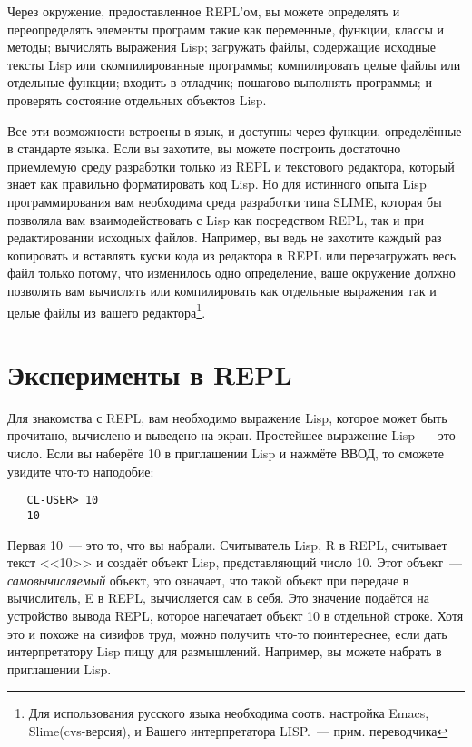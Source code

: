Через окружение, предоставленное REPL'ом, вы можете определять и переопределять элементы
программ такие как переменные, функции, классы и методы; вычислять выражения Lisp;
загружать файлы, содержащие исходные тексты Lisp или скомпилированные программы;
компилировать целые файлы или отдельные функции; входить в отладчик; пошагово выполнять
программы; и проверять состояние отдельных объектов Lisp.

Все эти возможности встроены в язык, и доступны через функции, определённые в стандарте
языка. Если вы захотите, вы можете построить достаточно приемлемую среду разработки только
из REPL и текстового редактора, который знает как правильно форматировать код Lisp. Но для
истинного опыта Lisp программирования вам необходима среда разработки типа SLIME, которая
бы позволяла вам взаимодействовать с Lisp как посредством REPL, так и при редактировании
исходных файлов. Например, вы ведь не захотите каждый раз копировать и вставлять куски
кода из редактора в REPL или перезагружать весь файл только потому, что изменилось одно
определение, ваше окружение должно позволять вам вычислять или компилировать как отдельные
выражения так и целые файлы из вашего редактора\footnote{Для использования русского языка
  необходима соотв. настройка Emacs, Slime(cvs-версия), и Вашего интерпретатора LISP.~---
  прим. переводчика}.

\section{Эксперименты в REPL}

Для знакомства с REPL, вам необходимо выражение Lisp, которое может быть прочитано, вычислено и выведено на экран. Простейшее выражение Lisp~--- это число. Если вы наберёте 10 в приглашении Lisp и нажмёте ВВОД, то сможете увидите что-то наподобие:

\begin{verbatim}
   CL-USER> 10
   10
\end{verbatim}

Первая 10~--- это то, что вы набрали. Считыватель Lisp, R в REPL, считывает текст <<10>> и
создаёт объект Lisp, представляющий число 10. Этот объект~--- \emph{самовычисляемый} объект,
это означает, что такой объект при передаче в вычислитель, E в REPL, вычисляется сам в
себя. Это значение подаётся на устройство вывода REPL, которое напечатает объект 10 в
отдельной строке. Хотя это и похоже на сизифов труд, можно получить что-то поинтереснее,
если дать интерпретатору Lisp пищу для размышлений. Например, вы можете набрать  в
приглашении Lisp.

